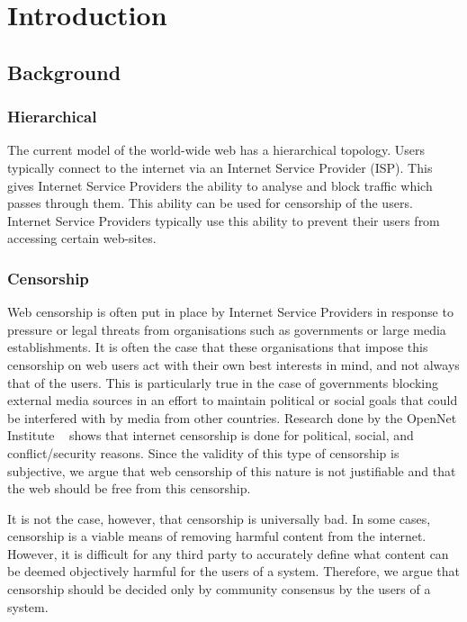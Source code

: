 \chapter{Introduction}

\section{Background}

\subsection{Hierarchical}

The current model of the world-wide web has a hierarchical topology. Users typically
connect to the internet via an Internet Service Provider (ISP).
This gives Internet Service Providers the ability to analyse and block traffic which
passes through them. This ability can be used for censorship of the users.
Internet Service Providers typically use this ability to prevent their users from
accessing certain web-sites.

\subsection{Censorship}

Web censorship is often put in place by Internet Service Providers in response
to pressure or legal threats from organisations such as governments or large media establishments.
It is often the case that these organisations that impose this censorship on web
users act with their own best interests in mind, and not always that of the users. This is
particularly true in the case of governments blocking external media sources in
an effort to maintain political or social goals that could be interfered with
by media from other countries. Research done by the OpenNet Institute ~\cite{opennet}
shows that internet censorship is done for political, social, and conflict/security
reasons. Since the validity of this type of censorship is subjective, we argue that
web censorship of this nature is not justifiable and that the web should be free
from this censorship.

It is not the case, however, that censorship is universally bad. In some cases,
censorship is a viable means of removing harmful content from the internet.
However, it is difficult for any third party to accurately define what content
can be deemed objectively harmful for the users of a system. Therefore, we argue
that censorship should be decided only by community consensus by the users of a system.

